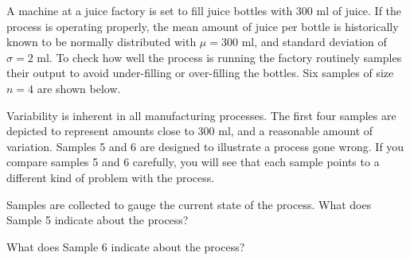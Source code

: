 \documentclass{ximera}
\begin{document}
\begin{exploration}\label{exp:OJ}
  A machine at a juice factory is set to fill juice bottles with 300 ml of juice.  If the process is operating properly, the mean amount of juice per bottle is historically known to be normally distributed with $\mu=300$ ml, and standard deviation of $\sigma=2$ ml. To check how well the process is running the factory routinely samples their output to avoid under-filling or over-filling the bottles.  Six samples of size $n=4$ are shown below.

\begin{center}
      \end{center}

Variability is inherent in all manufacturing processes.  The first four samples are depicted to represent amounts close to 300 ml, and a reasonable amount of variation.  Samples 5 and 6 are designed to illustrate a process gone wrong.  If you compare samples 5 and 6 carefully, you will see that each sample points to a different kind of problem with the process.

Samples are collected to gauge the current state of the process.  What does Sample 5 indicate about the process?

\begin{multipleChoice}
\end{multipleChoice}

What does Sample 6 indicate about the process?

\begin{multipleChoice}
\end{multipleChoice}
 \end{exploration}
\end{document}
